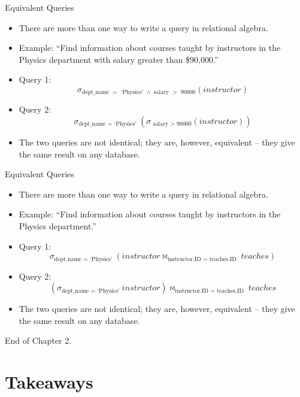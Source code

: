 \documentclass{beamer}
\begin{document}
\begin{frame}{Equivalent Queries}
    \begin{itemize}
        \item There are more than one way to write a query in relational algebra.
        \item Example: ``Find information about courses taught by instructors in the Physics department with salary greater than \$90,000.''
        \item Query 1: 
            $$
                \sigma_{\text{dept\_name } = \text{ `Physics' } \wedge \text{ salary } > \text{ 90000} } (instructor)
            $$
        \item Query 2: 
            $$
                \sigma_{\text{dept\_name } = \text{ `Physics' }} ( \sigma_{ \text{ salary } > \text{ 90000} } (instructor) )
            $$
        \item The two queries are not identical; they are, however, equivalent -- they give the same result on any database.
    \end{itemize}
\end{frame}

\begin{frame}{Equivalent Queries}
    \begin{itemize}
        \item There are more than one way to write a query in relational algebra.
        \item Example: ``Find information about courses taught by instructors in the Physics department.''
        \item Query 1: 
            $$
                \sigma_{\text{dept\_name } = \text{ `Physics' }} (instructor \Join_{\text{instructor.ID } = \text{ teaches.ID }} teaches )
            $$
        \item Query 2: 
            $$
                (\sigma_{\text{dept\_name } = \text{ `Physics' }} instructor) \Join_{\text{instructor.ID } = \text{ teaches.ID }} teaches 
            $$
        \item The two queries are not identical; they are, however, equivalent -- they give the same result on any database.
    \end{itemize}
\end{frame}

\begin{frame}{}
    \centering
    \Huge End of Chapter 2.
\end{frame}

\section*{Takeaways}
\end{document}
